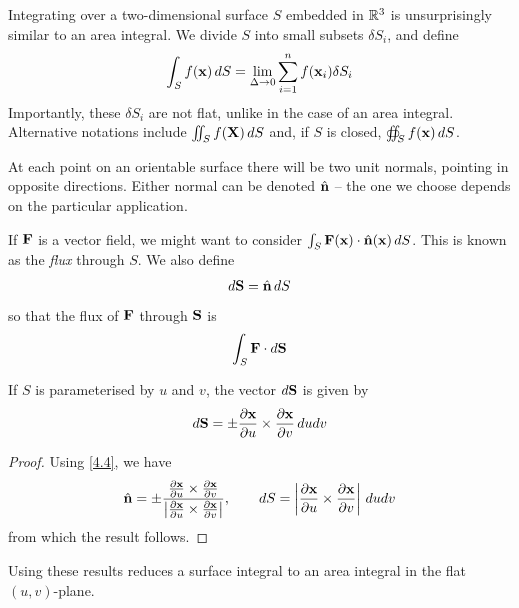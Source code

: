 \documentclass{../template/note}
\begin{document}
    Integrating over a two-dimensional surface \(S\) embedded in \(\mathbb R^3\) is unsurprisingly similar to an area integral. We divide \(S\) into small subsets \(\delta S_i\), and define
    \begin{align*}
        \int_S f(\V x) \D S = \lim_{\Delta \to 0} \sum_{i=1}^n f(\V x_i) \delta S_i
    \end{align*}
    Importantly, these \(\delta S_i\) are not flat, unlike in the case of an area integral. Alternative notations include \(\iint_S f(\V X) \D S\) and, if \(S\) is closed, \(\oiint_S f(\V x) \D S\).

    At each point on an orientable surface there will be two unit normals, pointing in opposite directions. Either normal can be denoted \(\hvec n\) -- the one we choose depends on the particular application.

    If \(\V F\) is a vector field, we might want to consider \(\int_S \V F(\V x) \cdot \hvec n(\V x) \D S\). This is known as the \emph{flux} through \(S\). We also define
    \begin{align*}
        d \V S = \hvec n \D S
    \end{align*}
    so that the flux of \(\V F\) through \(\V S\) is
    \begin{align*}
        \int_S \V F \cdot d \V S
    \end{align*}

    \begin{proposition}
        If \(S\) is parameterised by \(u\) and \(v\), the vector \(d \V S\) is given by
        \begin{align*}
            d \V S = \pm \pd{\V x}u \times \pd{\V x}v \D u dv
        \end{align*}
    \end{proposition}
    
    \begin{proof}
        Using \cref{4.4}, we have
        \begin{align*}
            \hvec n = \pm \frac{\pd{\V x}u \times \pd{\V x}v}{\left|\pd{\V x}u \times \pd{\V x}v\right|}, \qquad dS = \left|\pd{\V x}u \times \pd{\V x}v\right|\D u dv
        \end{align*}
        from which the result follows.
    \end{proof}
    
    Using these results reduces a surface integral to an area integral in the flat \((u, v)\)-plane.
    
\end{document}
